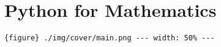 \label{385c7802}
\section{Python for Mathematics}\label{python-for-mathematics}

\texttt{\{figure\}\ ./img/cover/main.png\ -\/-\/-\ width:\ 50\%\ -\/-\/-}
